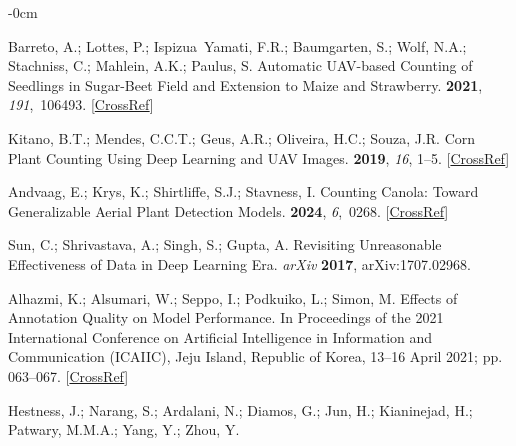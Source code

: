 \documentclass[12pt,a4paper,oneside]{report}
\newlength{\extralength}
\begin{document}
\begin{adjustwidth}{-\extralength}{0cm}
\begin{thebibliography}{999}
Barreto, A.; Lottes, P.; Ispizua~Yamati, F.R.; Baumgarten, S.; Wolf, N.A.;
Stachniss, C.; Mahlein, A.K.; Paulus, S.
\newblock Automatic {{UAV-based}} Counting of Seedlings in Sugar-Beet Field and
Extension to Maize and Strawberry.
 {\bf 2021}, {\em
191},~106493. [\href{http://dx.doi.org/10.1016/j.compag.2021.106493}{CrossRef}]

Kitano, B.T.; Mendes, C.C.T.; Geus, A.R.; Oliveira, H.C.; Souza, J.R.
\newblock Corn {{Plant Counting Using Deep Learning}} and {{UAV Images}}.
 {\bf 2019}, {\em 16}, 1--5. [\href{http://dx.doi.org/10.1109/LGRS.2019.2930549}{CrossRef}]

Andvaag, E.; Krys, K.; Shirtliffe, S.J.; Stavness, I.
\newblock Counting {{Canola}}: {{Toward Generalizable Aerial Plant Detection
Models}}.
 {\bf 2024}, {\em 6},~0268. [\href{http://dx.doi.org/10.34133/plantphenomics.0268}{CrossRef}]

Sun, C.; Shrivastava, A.; Singh, S.; Gupta, A.
\newblock Revisiting {{Unreasonable Effectiveness}} of {{Data}} in {{Deep
Learning Era}}. {\em arXiv} {\bf2017}, arXiv:1707.02968. 

Alhazmi, K.; Alsumari, W.; Seppo, I.; Podkuiko, L.; Simon, M.
\newblock Effects of Annotation Quality on Model Performance.
\newblock In Proceedings of the 2021 {{International Conference}} on
{{Artificial Intelligence}} in {{Information}} and {{Communication}}
({{ICAIIC}}), Jeju Island, Republic of Korea, 13--16 April 2021; pp. 063--067. [\href{http://dx.doi.org/10.1109/ICAIIC51459.2021.9415271}{CrossRef}]

Hestness, J.; Narang, S.; Ardalani, N.; Diamos, G.; Jun, H.; Kianinejad, H.;
Patwary, M.M.A.; Yang, Y.; Zhou, Y. 



\end{thebibliography}
\end{adjustwidth}
\end{document}

